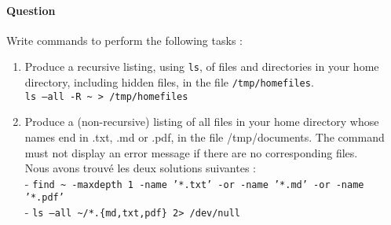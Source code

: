 \documentclass[a4paper,11pt]{article}
\newcounter{commande}[subsection]
\newcommand{\question}[1]{\addtocounter{commande}{1}\paragraph{Question \arabic{commande}}#1\;}
\begin{document}
\question{Write commands to perform the following tasks :}
\begin{enumerate}
  \item Produce a recursive listing, using \texttt{ls}, of files and directories in your home directory, including hidden files, in the file \texttt{/tmp/homefiles}. \\\texttt{ls --all -R \textasciitilde{} > /tmp/homefiles}\\
  
  
  \item Produce a (non-recursive) listing of all files in your home directory whose names end in .txt, .md or .pdf, in the file /tmp/documents. The command must not display an error message if there are no corresponding files. \\Nous avons trouvé les deux solutions suivantes :\\- \texttt{find \textasciitilde{} -maxdepth 1 -name '*.txt' -or -name '*.md' -or -name '*.pdf'} \\- \texttt{ls --all \textasciitilde/*.\{md,txt,pdf\} 2> /dev/null}
  
\end{enumerate}
\end{document}
